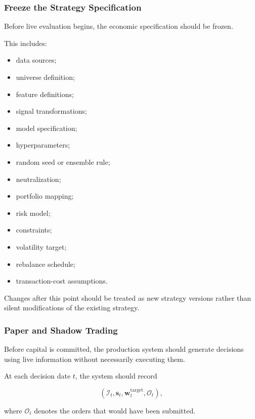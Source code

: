 \documentclass[11pt,a4paper]{article}
\begin{document}
\subsubsection{Freeze the Strategy Specification}

Before live evaluation begins, the economic specification should be frozen.

This includes:

\begin{itemize}
    \item data sources;
    \item universe definition;
    \item feature definitions;
    \item signal transformations;
    \item model specification;
    \item hyperparameters;
    \item random seed or ensemble rule;
    \item neutralization;
    \item portfolio mapping;
    \item risk model;
    \item constraints;
    \item volatility target;
    \item rebalance schedule;
    \item transaction-cost assumptions.
\end{itemize}

Changes after this point should be treated as new strategy versions rather than
silent modifications of the existing strategy.


\subsubsection{Paper and Shadow Trading}

Before capital is committed, the production system should generate decisions
using live information without necessarily executing them.

At each decision date $t$, the system should record

\begin{equation}
\boxed{
\left(
\mathcal{I}_t,
\mathbf{s}_t,
\mathbf{w}_t^{\mathrm{target}},
\mathcal{O}_t
\right),
}
\end{equation}

where $\mathcal{O}_t$ denotes the orders that would have been submitted.
\end{document}
